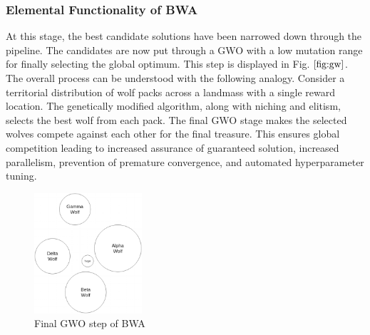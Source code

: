 \documentclass[conference]{IEEEtran}
\begin{document}
\subsubsection{Elemental Functionality of BWA}

At this stage, the best candidate solutions have been narrowed down through the pipeline. The candidates are now put through a GWO with a low mutation range for finally selecting the global optimum. This step is displayed in Fig. $\ref{fig:gw}$. The overall process can be understood with the following analogy. Consider a territorial distribution of wolf packs across a landmass with a single reward location. The genetically modified algorithm, along with niching and elitism, selects the best wolf from each pack. The final GWO stage makes the selected wolves compete against each other for the final treasure. This ensures global competition leading to increased assurance of guaranteed solution, increased parallelism, prevention of premature convergence, and automated hyperparameter tuning.  

\begin{figure}[t]
\centering\includegraphics[width=4cm]{gwo.png}
\caption{Final GWO step of BWA }
\label{fig:gw}    
\end{figure}
\end{document}
